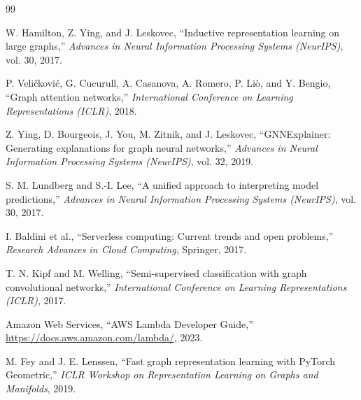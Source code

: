 \documentclass[12pt,a4paper]{report}
\begin{document}
\begin{thebibliography}{99}

W. Hamilton, Z. Ying, and J. Leskovec,
``Inductive representation learning on large graphs,''
\emph{Advances in Neural Information Processing Systems (NeurIPS)},
vol. 30, 2017.

P. Veličković, G. Cucurull, A. Casanova, A. Romero, P. Liò,
and Y. Bengio,
``Graph attention networks,''
\emph{International Conference on Learning Representations (ICLR)},
2018.

Z. Ying, D. Bourgeois, J. You, M. Zitnik, and J. Leskovec,
``GNNExplainer: Generating explanations for graph neural networks,''
\emph{Advances in Neural Information Processing Systems (NeurIPS)},
vol. 32, 2019.

S. M. Lundberg and S.-I. Lee,
``A unified approach to interpreting model predictions,''
\emph{Advances in Neural Information Processing Systems (NeurIPS)},
vol. 30, 2017.

I. Baldini et al.,
``Serverless computing: Current trends and open problems,''
\emph{Research Advances in Cloud Computing}, Springer, 2017.

T. N. Kipf and M. Welling,
``Semi-supervised classification with graph convolutional networks,''
\emph{International Conference on Learning Representations (ICLR)},
2017.

Amazon Web Services,
``AWS Lambda Developer Guide,''
\url{https://docs.aws.amazon.com/lambda/}, 2023.

M. Fey and J. E. Lenssen,
``Fast graph representation learning with PyTorch Geometric,''
\emph{ICLR Workshop on Representation Learning on Graphs and Manifolds},
2019.

\end{thebibliography}
\end{document}
